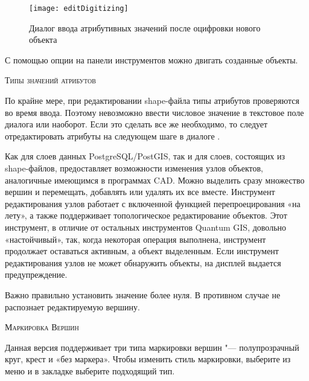 \begin{figure}[ht]
   \centering
   \texttt{[image: editDigitizing]}
   \caption{Диалог ввода атрибутивных значений после оцифровки нового объекта \nixcaption}\label{fig:vector_digitising}
 \end{figure}

С помощью опции  на
панели инструментов можно двигать созданные объекты.

\begin{Tip}\caption{\textsc{Типы значений атрибутов}}
По крайне мере, при редактировании shape-файла типы атрибутов проверяются
во время ввода. Поэтому невозможно ввести числовое значение в текстовое поле
диалога   или наоборот. Если это сделать все же необходимо,
то следует отредактировать атрибуты на следующем шаге в диалоге
.
\end{Tip}


Как для слоев данных PostgreSQL/PostGIS, так и для слоев, состоящих из
shape-файлов,  предоставляет
возможности изменения узлов объектов, аналогичные имеющимся в программах CAD.
Можно выделить сразу множество вершин и перемещать, добавлять или удалять
их все вместе. Инструмент редактирования узлов работает с включенной функцией
перепроецирования «на лету», а также поддерживает топологическое редактирование
объектов. Этот инструмент, в отличие от остальных инструментов Quantum GIS,
довольно «настойчивый», так, когда некоторая операция выполнена, инструмент
продолжает оставаться активным, а объект выделенным. Если инструмент
редактирования узлов не может обнаружить объекты, на дисплей выдается
предупреждение.

Важно правильно установить  \arrow
{} \arrow
{} \arrow {} значение более нуля.
В противном случае \qg не распознает редактируемую вершину.
\begin{Tip}\caption{\textsc{Маркировка Вершин}}
Данная версия \qg поддерживает три типа маркировки вершин "--- полупрозрачный
круг, крест и «без маркера». Чтобы изменить стиль маркировки, выберите
 из меню 
и в закладке  выберите подходящий тип.
\end{Tip}

